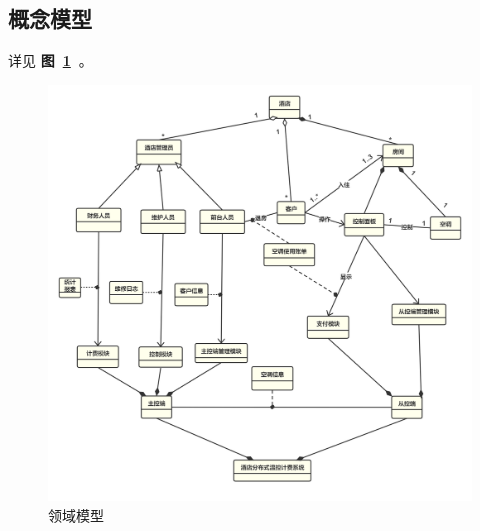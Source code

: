 \documentclass[blue,normal,cn]{elegantnote}
\begin{document}
\subsection{概念模型}
详见 \textbf{图~\ref{fig:domain}~}。

\begin{figure}[!htbp]
	\centering
	\includegraphics[width=1\textwidth]{domain}
	\caption{领域模型}
	\label{fig:domain}
\end{figure}
\end{document}
